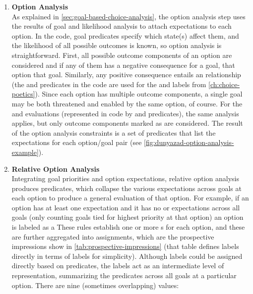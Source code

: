 \begin{enumerate}[leftmargin=1.4em]
\item %
\textbf{Option Analysis} \\
\label{page:option-analysis}%
%
As explained in \cref{sec:goal-based-choice-analysis}, the option analysis step uses the results of goal and likelihood analysis to attach expectations to each option.
%
In the code, goal predicates specify which state(s) affect them, and the likelihood of all possible outcomes is known, so option analysis is straightforward.
%
First, all possible outcome components of an option are considered and if any of them has a negative consequence for a goal, that option  that goal.
%
Similarly, any positive consequence entails an  relationship (the  and  predicates in the code are used for the  and  labels from \cref{ch:choice-poetics}).
%
Since each option has multiple outcome components, a single goal may be both threatened and enabled by the same option, of course.
%
For the  and  evaluations (represented in code by  and  predicates), the same analysis applies, but only outcome components marked as  are considered.
%
The result of the option analysis constraints is a set of  predicates that list the expectations for each option/goal pair (see \cref{fig:dunyazad-option-analysis-example}).

\item %
\textbf{Relative Option Analysis} \\
%
Integrating goal priorities and option expectations, relative option analysis produces  predicates, which collapse the various expectations across goals at each option to produce a general evaluation of that option.
%
For example, if an option has at least one  expectation and it has no  or  expectations across all goals (only counting goals tied for highest priority at that option) an option is labeled as a 
%
These rules establish one or more s for each option, and these are further aggregated into  assignments, which are the prospective impressions show in \cref{tab:prospective-impressions} (that table defines  labels directly in terms of  labels for simplicity).
%
Although  labels could be assigned directly based on  predicates, the  labels act as an intermediate level of representation, summarizing the  predicates across all goals at a particular option.
%
There are nine (sometimes overlapping)  values:


\end{enumerate}
